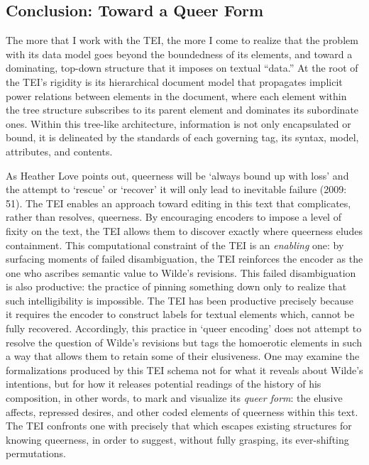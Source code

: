 \documentclass[11pt]{article}
\begin{document}
\subsection{Conclusion: Toward a Queer Form}
\label{sec:orgfbf96a3}

The more that I work with the TEI, the more I come to realize that the
problem with its data model goes beyond the boundedness of its
elements, and toward a dominating, top-down structure that it imposes
on textual “data.” At the root of the TEI's rigidity is its
hierarchical document model that propagates implicit power relations
between elements in the document, where each element within the tree
structure subscribes to its parent element and dominates its
subordinate ones. Within this tree-like architecture, information is
not only encapsulated or bound, it is delineated by the standards of
each governing tag, its syntax, model, attributes, and contents.

As Heather Love points out, queerness will be ‘always bound up with
loss' and the attempt to ‘rescue' or ‘recover' it will only lead to
inevitable failure (2009: 51). The TEI enables an approach toward
editing in this text that complicates, rather than resolves,
queerness. By encouraging encoders to impose a level of fixity on the
text, the TEI allows them to discover exactly where queerness eludes
containment. This computational constraint of the TEI is an \emph{enabling}
one: by surfacing moments of failed disambiguation, the TEI reinforces
the encoder as the one who ascribes semantic value to Wilde's
revisions.  This failed disambiguation is also productive: the
practice of pinning something down only to realize that such
intelligibility is impossible.  The TEI has been productive precisely
because it requires the encoder to construct labels for textual
elements which, cannot be fully recovered.  Accordingly, this practice
in ‘queer encoding' does not attempt to resolve the question of
Wilde's revisions but tags the homoerotic elements in such a way that
allows them to retain some of their elusiveness. One may examine the
formalizations produced by this TEI schema not for what it reveals
about Wilde's intentions, but for how it releases potential readings
of the history of his composition, in other words, to mark and
visualize its \emph{queer form}: the elusive affects, repressed desires,
and other coded elements of queerness within this text. The TEI
confronts one with precisely that which escapes existing structures
for knowing queerness, in order to suggest, without fully grasping,
its ever-shifting permutations.
\end{document}
